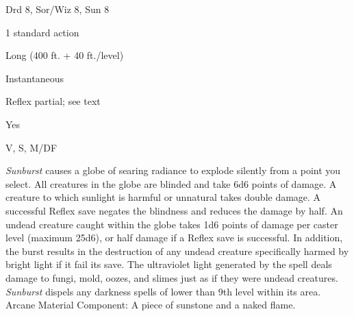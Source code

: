 
\begin{description*}
\item[Level:] Drd 8, Sor/Wiz 8, Sun 8
\item[Casting Time:] 1 standard action
\item[Range:] Long (400 ft. + 40 ft./level)
\item[Duration:] Instantaneous
\item[Saving Throw:] Reflex partial; see text
\item[Spell Resistance:] Yes
\item[Components:] V, S, M/DF
\end{description*}

\textit{Sunburst} causes a globe of searing radiance to explode silently from a
point you select. All creatures in the globe are blinded and take 6d6 points of
damage. A creature to which sunlight is harmful or unnatural takes double damage.
A successful Reflex save negates the blindness and reduces the damage by half.
An undead creature caught within the globe takes 1d6 points of damage per caster
level (maximum 25d6), or half damage if a Reflex save is successful. In addition,
the burst results in the destruction of any undead creature specifically harmed
by bright light if it fail its save.
The ultraviolet light generated by the spell deals damage to fungi, mold, oozes,
and slimes just as if they were undead creatures.
\textit{Sunburst} dispels any darkness spells of lower than 9th level within its
area.
Arcane Material Component: A piece of sunstone and a naked flame.